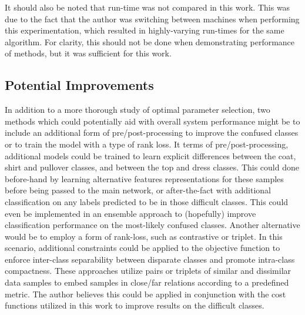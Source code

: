 \documentclass[conference]{IEEEtran}
\begin{document}
It should also be noted that run-time was not compared in this work.  This was due to the fact that the author was switching between machines when performing this experimentation, which resulted in highly-varying run-times for the same algorithm.  For clarity, this should not be done when demonstrating performance of methods, but it was sufficient for this work. 

\subsection{Potential Improvements}
In addition to a more thorough study of optimal parameter selection, two methods which could potentially aid with overall system performance might be to include an additional form of pre/post-processing to improve the confused classes or to train the model with a type of rank loss.  It terms of pre/post-processing, additional models could be trained to learn explicit differences between the coat, shirt and  pullover classes, and between the top and dress classes.  This could done before-hand by learning alternative  features representations for these samples before being passed to the main network, or after-the-fact with additional classification on any labels predicted to be in those difficult classes.  This could even be implemented in an ensemble approach to (hopefully) improve classification performance on the most-likely confused classes.  Another alternative  would be to employ a form of rank-loss, such as contrastive or triplet.  In this scenario, additional constraints could be applied to the objective function to enforce inter-class separability between disparate classes and promote intra-class compactness.  These approaches utilize pairs or triplets of similar and  dissimilar data samples to embed samples  in close/far relations according to a predefined metric.  The author believes this could be applied  in conjunction with the cost functions utilized in this work to improve results on the difficult classes.




\end{document}
